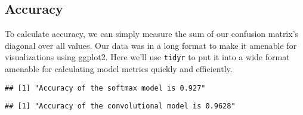 \documentclass[]{book}
\newenvironment{Shaded}{\begin{snugshade}}{\end{snugshade}}
\newcommand{\KeywordTok}[1]{\textcolor[rgb]{0.13,0.29,0.53}{\textbf{#1}}}
\newcommand{\DecValTok}[1]{\textcolor[rgb]{0.00,0.00,0.81}{#1}}
\newcommand{\StringTok}[1]{\textcolor[rgb]{0.31,0.60,0.02}{#1}}
\newcommand{\ControlFlowTok}[1]{\textcolor[rgb]{0.13,0.29,0.53}{\textbf{#1}}}
\newcommand{\OperatorTok}[1]{\textcolor[rgb]{0.81,0.36,0.00}{\textbf{#1}}}
\newcommand{\NormalTok}[1]{#1}
\theoremstyle{definition}
\theoremstyle{definition}
\theoremstyle{definition}
\theoremstyle{remark}
\begin{document}
\subsection{Accuracy}\label{accuracy}

To calculate accuracy, we can simply measure the sum of our confusion
matrix's diagonal over all values. Our data was in a long format to make
it amenable for visualizations using ggplot2. Here we'll use
\texttt{tidyr} to put it into a wide format amenable for calculating
model metrics quickly and efficiently.

\begin{Shaded}
\end{Shaded}

\begin{verbatim}
## [1] "Accuracy of the softmax model is 0.927"
\end{verbatim}

\begin{Shaded}
\end{Shaded}

\begin{verbatim}
## [1] "Accuracy of the convolutional model is 0.9628"
\end{verbatim}
\end{document}
